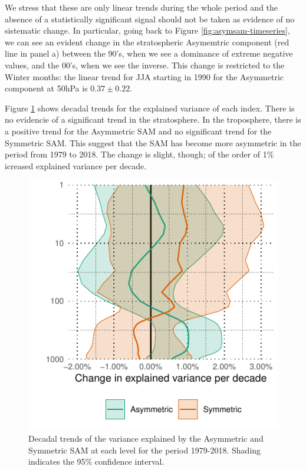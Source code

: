 \documentclass[]{ametsocV5}
\begin{document}
We stress that these are only linear trends during the whole period and
the absence of a statistically significant signal should not be taken as
evidence of no sistematic change. In particular, going back to Figure
\ref{fig:asymsam-timeseries}, we can see an evident change in the
stratospheric Asymemtric component (red line in panel a) between the
90's, when we see a dominance of extreme negative values, and the 00's,
when we see the inverse. This change is restricted to the Winter months:
the linear trend for JJA starting in 1990 for the Asymmetric component
at 50hPa is \(0.37 \pm 0.22\).

Figure \ref{fig:r-squared-trend} shows decadal trends for the explained
variance of each index. There is no evidencie of a significant trend in
the stratosphere. In the troposphere, there is a positive trend for the
Asymmetric SAM and no significant trend for the Symmetric SAM. This
suggest that the SAM has become more asymmetric in the period from 1979
to 2018. The change is slight, though; of the order of 1\% icreased
explained variance per decade.

\begin{figure}
\includegraphics{r-squared-trend-1} \caption[Decadal trends of the variance explained by the Asymmetric and Symmetric SAM at each level for the period 1979-2018]{Decadal trends of the variance explained by the Asymmetric and Symmetric SAM at each level for the period 1979-2018. Shading indicates the 95\% confidence interval.}\label{fig:r-squared-trend}
\end{figure}
\end{document}
